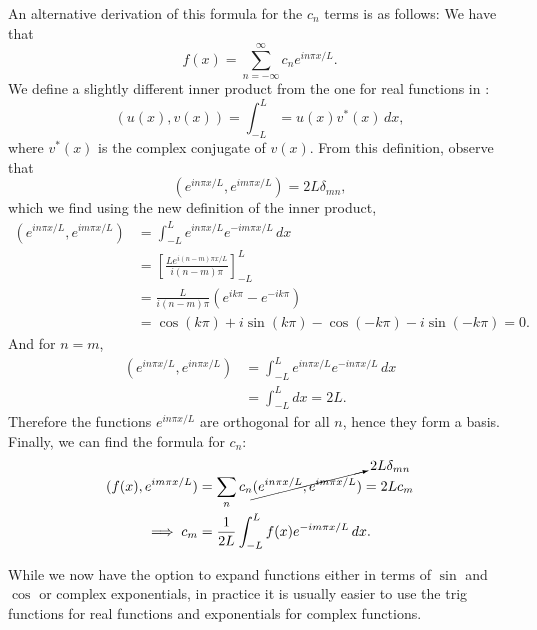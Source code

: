 An alternative derivation of this formula for the $c_n$ terms is as follows: We have that
\[
f(x) = \sum_{n=-\infty}^{\infty} c_n e^{in\pi x/L}.
\]
We define a slightly different inner product from the one for real functions in :
\begin{equation}\label{eq:innerprodcomplex}
	\left(u(x), v(x)\right) = \int_{-L}^L = u(x)v^*(x) \,dx,
\end{equation}
where $v^*(x)$ is the complex conjugate of $v(x)$. From this definition, observe that
\[
\left(e^{in\pi x/L}, e^{im\pi x/L}\right) = 2L\delta_{mn},
\]
which we find using the new definition of the inner product,
\begin{align*}
	\left(e^{in\pi x/L}, e^{im\pi x/L}\right) &= \int_{-L}^L e^{in\pi x/L}e^{-im\pi x/L} \,dx \tag{$n \neq m$} \\
	&= \left[ \frac{Le^{i(n-m)\pi x/L}}{i(n-m)\pi} \right]_{-L}^L \\
	&= \frac{L}{i(n-m)\pi} \left(e^{ik\pi} - e^{-ik\pi}\right) \tag{$k=n-m$} \\
	&= \cos(k\pi) + i\sin(k\pi) - \cos(-k\pi) - i\sin(-k\pi) = 0.
\end{align*}
And for $n=m$,
\begin{align*}
	(e^{in\pi x/L}, e^{in\pi x/L}) &= \int_{-L}^L e^{in\pi x/L}e^{-in\pi x/L} \,dx \\
	&= \int_{-L}^L dx = 2L.
\end{align*}
Therefore the functions $e^{in\pi x/L}$ are orthogonal for all $n$, hence they form a basis. Finally, we can find the formula for $c_n$:
\begin{align*}
	(f(x), e^{im\pi x/L}) &= \sum_n c_n \cancelto{2L\delta_{mn}}{(e^{in\pi x/L}, e^{im\pi x/L})} = 2L c_m \\
	\implies c_m &= \frac{1}{2L} \int_{-L}^L f(x) e^{-im\pi x/L} \,dx.
\end{align*}

\begin{remark}
	While we now have the option to expand functions either in terms of $\sin$ and $\cos$ or complex exponentials, in practice it is usually easier to use the trig functions for real functions and exponentials for complex functions.
\end{remark}

